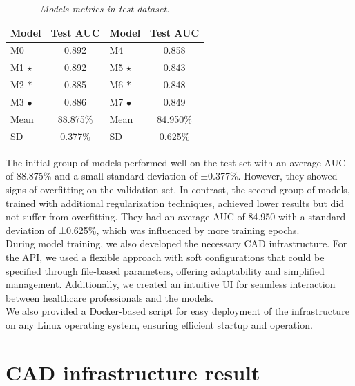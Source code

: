 \begin{table}[H]
\centering
\begin{tabular}{lc|lc}
    \toprule
  \textbf{Model} & \textbf{Test AUC} & \cellcolor{gray!50}\textbf{Model} & \cellcolor{gray!50}\textbf{Test AUC}  \\
\midrule
 M0 & 0.892 & \cellcolor{gray!50}M4 & \cellcolor{gray!50}0.858 \\
 M1 $\star$ & 0.892 & \cellcolor{gray!50}M5 $\star$ & \cellcolor{gray!50}0.843 \\
 M2 $\ast$ &  0.885 &  \cellcolor{gray!50}M6 $\ast$ & \cellcolor{gray!50}0.848 \\
 M3 $\bullet$ & 0.886 & \cellcolor{gray!50}M7 $\bullet$ & \cellcolor{gray!50}0.849 \\
 \midrule
Mean &  88.875\% & \cellcolor{gray!50}Mean & \cellcolor{gray!50}84.950\%  \\
SD &  0.377\%  &   \cellcolor{gray!50}SD &  \cellcolor{gray!50}0.625\%  \\

\bottomrule
\end{tabular}
\caption[Models metrics in test dataset]
  {\textit{Models metrics in test dataset.}}
{\label{table:test-set-resume-metrics}}
\end{table}

The initial group of models performed well on the test set with an average AUC
of 88.875\% and a small standard deviation of ±0.377\%. However, they showed
signs of overfitting on the validation set. In contrast, the second group of
models, trained with additional regularization techniques, achieved lower
results but did not suffer from overfitting. They had an average AUC of 84.950%
with a standard deviation of ±0.625\%, which was influenced by more training
epochs. \\

During model training, we also developed the necessary CAD infrastructure. For
the API, we used a flexible approach with soft configurations that could be
specified through file-based parameters, offering adaptability and simplified
management. Additionally, we created an intuitive UI for seamless interaction
between healthcare professionals and the models. \\

We also provided a Docker-based script for easy deployment of the
infrastructure on any Linux operating system, ensuring efficient startup and
operation.

\section{CAD infrastructure result}
